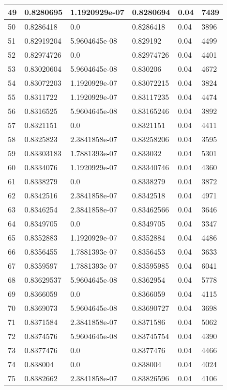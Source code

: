\begin{longtable}{|l|l|l|l|l|l|}
49 & 0.8280695 & 1.1920929e-07 & 0.8280694 & 0.04 & 7439 \\ \hline 
50 & 0.8286418 & 0.0 & 0.8286418 & 0.04 & 3896 \\ \hline 
51 & 0.82919204 & 5.9604645e-08 & 0.829192 & 0.04 & 4499 \\ \hline 
52 & 0.82974726 & 0.0 & 0.82974726 & 0.04 & 4401 \\ \hline 
53 & 0.83020604 & 5.9604645e-08 & 0.830206 & 0.04 & 4672 \\ \hline 
54 & 0.83072203 & 1.1920929e-07 & 0.83072215 & 0.04 & 3824 \\ \hline 
55 & 0.8311722 & 1.1920929e-07 & 0.83117235 & 0.04 & 4474 \\ \hline 
56 & 0.8316525 & 5.9604645e-08 & 0.83165246 & 0.04 & 3892 \\ \hline 
57 & 0.8321151 & 0.0 & 0.8321151 & 0.04 & 4411 \\ \hline 
58 & 0.8325823 & 2.3841858e-07 & 0.83258206 & 0.04 & 3595 \\ \hline 
59 & 0.83303183 & 1.7881393e-07 & 0.833032 & 0.04 & 5301 \\ \hline 
60 & 0.8334076 & 1.1920929e-07 & 0.83340746 & 0.04 & 4360 \\ \hline 
61 & 0.8338279 & 0.0 & 0.8338279 & 0.04 & 3872 \\ \hline 
62 & 0.8342516 & 2.3841858e-07 & 0.8342518 & 0.04 & 4971 \\ \hline 
63 & 0.8346254 & 2.3841858e-07 & 0.83462566 & 0.04 & 3646 \\ \hline 
64 & 0.8349705 & 0.0 & 0.8349705 & 0.04 & 3347 \\ \hline 
65 & 0.8352883 & 1.1920929e-07 & 0.8352884 & 0.04 & 4486 \\ \hline 
66 & 0.8356455 & 1.7881393e-07 & 0.8356453 & 0.04 & 3633 \\ \hline 
67 & 0.8359597 & 1.7881393e-07 & 0.83595985 & 0.04 & 6041 \\ \hline 
68 & 0.83629537 & 5.9604645e-08 & 0.8362954 & 0.04 & 5778 \\ \hline 
69 & 0.8366059 & 0.0 & 0.8366059 & 0.04 & 4115 \\ \hline 
70 & 0.8369073 & 5.9604645e-08 & 0.83690727 & 0.04 & 3698 \\ \hline 
71 & 0.8371584 & 2.3841858e-07 & 0.8371586 & 0.04 & 5062 \\ \hline 
72 & 0.8374576 & 5.9604645e-08 & 0.83745754 & 0.04 & 4390 \\ \hline 
73 & 0.8377476 & 0.0 & 0.8377476 & 0.04 & 4466 \\ \hline 
74 & 0.838004 & 0.0 & 0.838004 & 0.04 & 4024 \\ \hline 
75 & 0.8382662 & 2.3841858e-07 & 0.83826596 & 0.04 & 4106 \\ \hline 
\end{longtable}